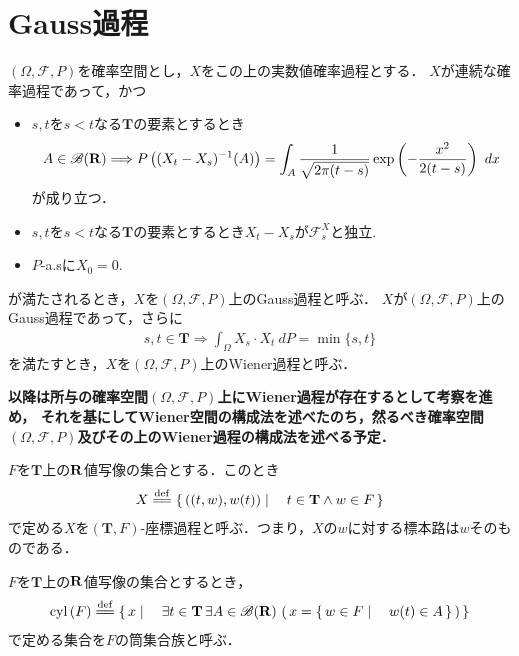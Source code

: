 \section{Gauss過程}
	$(\Omega,\mathscr{F},P)$を確率空間とし，$X$をこの上の実数値確率過程とする．
	$X$が連続な確率過程であって，かつ
	\begin{itemize}
		\item $s,t$を$s < t$なる$\mathbf{T}$の要素とするとき
			\begin{align}
				A \in \mathscr{B}(\mathbf{R}) \Longrightarrow
				P\left((X_t-X_s)^{-1}(A)\right)
				= \int_A \frac{1}{\sqrt{2\pi(t-s)}} \exp\left(-\frac{x^2}{2(t-s)}\right)\ dx
			\end{align}
			が成り立つ．
		
		\item $s,t$を$s < t$なる$\mathbf{T}$の要素とするとき$X_t - X_s$が$\mathscr{F}^X_s$と独立.
			
		\item $P$-a.sに$X_0 = 0$.
	\end{itemize}
	が満たされるとき，$X$を$(\Omega,\mathscr{F},P)$上のGauss過程と呼ぶ．
	$X$が$(\Omega,\mathscr{F},P)$上のGauss過程であって，さらに
	\begin{align}
		s,t \in \mathbf{T} \Longrightarrow \int_\Omega X_s \cdot X_t\ dP = \min{\{s,t\}}
	\end{align}
	を満たすとき，$X$を$(\Omega,\mathscr{F},P)$上のWiener過程と呼ぶ．
	
	{\bf 以降は所与の確率空間$(\Omega,\mathscr{F},P)$上にWiener過程が存在するとして考察を進め，
	それを基にしてWiener空間の構成法を述べたのち，然るべき確率空間$(\Omega,\mathscr{F},P)$及びその上のWiener過程の構成法を述べる予定．}
	
	\begin{screen}
		\begin{dfn}[座標過程]
			$F$を$\mathbf{T}$上の$\mathbf{R}$値写像の集合とする．このとき
			\begin{align}
				X \defeq \Set{((t,w),w(t))}{t \in \mathbf{T} \wedge w \in F}
			\end{align}
			で定める$X$を$(\mathbf{T},F)$-座標過程と呼ぶ．つまり，$X$の$w$に対する標本路は$w$そのものである．
		\end{dfn}
	\end{screen}
	
	\begin{screen}
		\begin{dfn}[筒集合]
			$F$を$\mathbf{T}$上の$\mathbf{R}$値写像の集合とするとき，
			\begin{align}
				\cyl{F} \defeq 
				\Set{x}{\exists t \in \mathbf{T}\, \exists A \in \borel{\R}\, 
				\left(\, x = \Set{w \in F}{w(t) \in A}\, \right)}
			\end{align}
			で定める集合を$F$の筒集合族と呼ぶ．
		\end{dfn}
	\end{screen}
	

